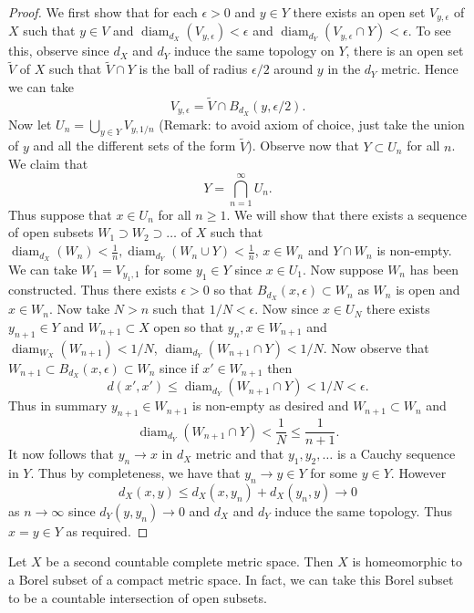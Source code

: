 \documentclass[twoside, a4paper, 10pt]{amsart}
\begin{document}
\begin{proof} We first show that for each $\epsilon>0$ and $y \in Y$ there exists an open set $V_{y,\epsilon}$ of $X$ such that $y \in V$ and $\operatorname{diam}_{d_X}(V_{y,\epsilon}) < \epsilon$ and $\operatorname{diam}_{d_Y}(V_{y,\epsilon} \cap Y) < \epsilon$. To see this, observe since $d_X$ and $d_Y$ induce the same topology on $Y$, there is an open set $\tilde{V}$ of $X$ such that $\tilde{V} \cap Y$ is the ball of radius $\epsilon/2$ around $y$ in the $d_Y$ metric. Hence we can take $$V_{y, \epsilon} = \tilde{V} \cap B_{d_X}(y, \epsilon/2).$$ Now let $U_n = \bigcup_{y \in Y} V_{y,1/n}$ (Remark: to avoid axiom of choice, just take the union of $y$ and all the different sets of the form $\tilde{V}$). Observe now that $Y \subset U_n$ for all $n$. We claim that $$Y = \bigcap_{n = 1}^{\infty} U_n.$$ Thus suppose that $x \in U_n$ for all $n \geq 1$. We will show that there exists a sequence of open subsets $W_1 \supset W_2 \supset \ldots$ of $X$ such that $\operatorname{diam}_{d_X}(W_n) < \frac{1}{n}, \operatorname{diam}_{d_Y}(W_n \cup Y) < \frac{1}{n}$, $x \in W_n$ and $Y \cap W_n$ is non-empty. We can take $W_1 = V_{y_1,1}$ for some $y_1 \in Y$ since $x \in U_1$. Now suppose $W_n$ has been constructed. Thus there exists $\epsilon>0$ so that $B_{d_X}(x, \epsilon) \subset W_n$ as $W_n$ is open and $x \in W_n$. Now take $N>n$ such that $1/N< \epsilon$. Now since $x \in U_N$ there exists $y_{n+1} \in Y$ and $W_{n+1} \subset X$ open so that $y_n, x \in W_{n+1}$ and $\operatorname{diam}_{W_X}(W_{n+1}) < 1/N$, $\operatorname{diam}_{d_Y}(W_{n+1} \cap Y) < 1/N$. Now observe that $W_{n+1} \subset B_{d_X}(x, \epsilon) \subset W_n$ since if $x' \in W_{n+1}$ then $$d(x',x') \leq \operatorname{diam}_{d_Y}(W_{n+1} \cap Y) < 1/N < \epsilon.$$ Thus in summary $y_{n+1} \in W_{n+1}$ is non-empty as desired and $W_{n+1} \subset W_n$ and $$\operatorname{diam}_{d_Y}(W_{n+1} \cap Y) < \frac{1}{N} \leq \frac{1}{n+1}.$$ It now follows that $y_n \to x$ in $d_X$ metric and that $y_1,y_2, \ldots$ is a Cauchy sequence in $Y$. Thus by completeness, we have that $y_n \to y \in Y$ for some $y \in Y$. However $$d_X(x,y) \leq d_X(x,y_n) + d_X(y_n,y) \to 0$$ as $n \to \infty$ since $d_Y(y,y_n) \to 0$ and $d_X$ and $d_Y$ induce the same topology. Thus $x=y \in Y$ as required.\end{proof}

\begin{corol}\label{corol: embedding Polish into compact} Let $X$ be a second countable complete metric space. Then $X$ is homeomorphic to a Borel subset of a compact metric space. In fact, we can take this Borel subset to be a countable intersection of open subsets.

\end{corol}
\end{document}
